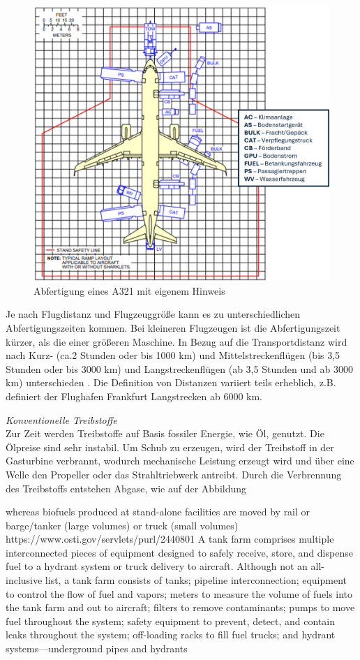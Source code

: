 \begin{figure}[h]
	\centering
	\includegraphics[width=0.8\linewidth]{Bilder/A321_Abfertigung.png}
	\caption[Abfertigung]{Abfertigung eines A321 \cite{airbus2022a321} mit eigenem Hinweis}
	\label{abfertigung}
\end{figure}

Je nach Flugdistanz und Flugzeuggröße kann es zu unterschiedlichen Abfertigungszeiten kommen. 
Bei kleineren Flugzeugen ist die Abfertigungszeit kürzer, als die einer größeren Maschine. 
In Bezug auf die Transportdistanz wird nach Kurz- (ca.2 Stunden oder bis 1000 km) 
und Mittelstreckenflügen (bis 3,5 Stunden oder bis 3000 km) und 
Langstreckenflügen (ab 3,5 Stunden und ab 3000 km) unterschieden \cite{mensen2013handbuch}.
Die Definition von Distanzen variiert teils erheblich, 
z.B. definiert der Flughafen Frankfurt Langstrecken ab 6000 km.%

\textit{Konventionelle Treibstoffe}\\

Zur Zeit werden Treibstoffe auf Basis fossiler Energie, wie Öl, genutzt. 
Die Ölpreise sind sehr instabil. %
Um Schub zu erzeugen, wird der Treibstoff in der Gasturbine verbrannt, 
wodurch mechanische Leistung erzeugt wird und über eine Welle den 
Propeller oder das Strahltriebwerk antreibt. 
Durch die Verbrennung des Treibstoffs entstehen Abgase, wie auf der Abbildung

whereas biofuels produced at stand-alone facilities are
moved by rail or barge/tanker (large volumes) or truck (small volumes)
https://www.osti.gov/servlets/purl/2440801
A tank farm
comprises multiple interconnected pieces of equipment designed to safely receive, store, and
dispense fuel to a hydrant system or truck delivery to aircraft. Although not an all-inclusive list, a
tank farm consists of tanks; pipeline interconnection; equipment to control the flow of fuel and
vapors; meters to measure the volume of fuels into the tank farm and out to aircraft; filters to
remove contaminants; pumps to move fuel throughout the system; safety equipment to prevent,
detect, and contain leaks throughout the system; off-loading racks to fill fuel trucks; and hydrant
systems—underground pipes and hydrants
